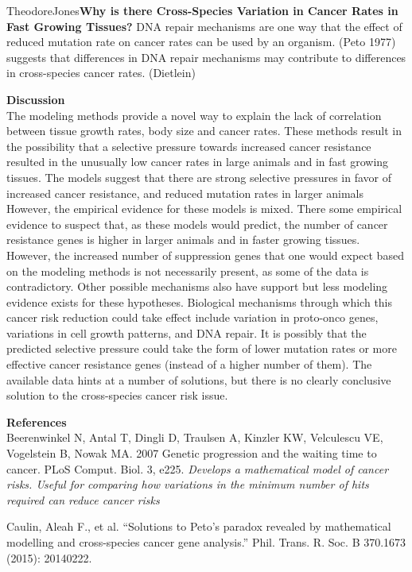 \documentclass[12pt,letterpaper]{article}
\begin{document}
\begin{mla}{Theodore}{Jones}{}{}{}{\textbf{Why is there Cross-Species Variation in Cancer Rates in Fast Growing Tissues?}}
DNA repair mechanisms are one way that the effect of reduced mutation rate on cancer rates can be used by an organism. (Peto 1977) suggests that differences in DNA repair mechanisms may contribute to differences in cross-species cancer rates. (Dietlein)


\textbf{Discussion} \\
The modeling methods provide a novel way to explain the lack of correlation between tissue growth rates, body size and cancer rates. These methods result in the possibility that a selective pressure towards increased cancer resistance resulted in the unusually low cancer rates in large animals and in fast growing tissues. The models suggest that there are strong selective pressures in favor of increased cancer resistance, and reduced mutation rates in larger animals
 However, the empirical evidence for these models is mixed. There some empirical evidence to suspect that, as these models would predict, the number of cancer resistance genes is higher in larger animals and in faster growing tissues. However, the increased number of suppression genes that one would expect based on the modeling methods is not necessarily present, as some of the data is contradictory. Other possible mechanisms also have support but less modeling evidence exists for these hypotheses. Biological mechanisms through which this cancer risk reduction could take effect include variation in proto-onco genes, variations in cell growth patterns, and DNA repair.
 It is possibly that the predicted selective pressure could take the form of lower mutation rates or more effective cancer resistance genes (instead of a higher number of them). The available data hints at a number of solutions, but there is no clearly conclusive solution to the cross-species cancer risk issue. 


\newpage
\noindent \textbf{References}\\
\setlength{\parindent}{0pt}
Beerenwinkel N, Antal T, Dingli D, Traulsen A, Kinzler KW, Velculescu VE, Vogelstein B, Nowak MA. 2007 Genetic progression and the waiting time to cancer. PLoS Comput. Biol. 3, e225. 
\emph{Develops a mathematical model of cancer risks. Useful for comparing how variations in the minimum number of hits required can reduce cancer risks}

Caulin, Aleah F., et al. “Solutions to Peto’s paradox revealed by mathematical modelling and cross-species cancer gene analysis.” Phil. Trans. R. Soc. B 370.1673 (2015): 20140222.\\


\end{mla}
\end{document}
